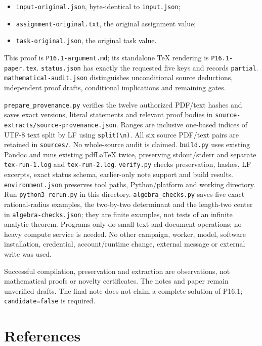 \documentclass[
  11pt,
]{article}
\providecommand{\tightlist}{%
  \setlength{\itemsep}{0pt}\setlength{\parskip}{0pt}}
\begin{document}
\begin{itemize}
\tightlist
\item
  \texttt{input-original.json}, byte-identical to \texttt{input.json};
\item
  \texttt{assignment-original.txt}, the original assignment value;
\item
  \texttt{task-original.json}, the original task value.
\end{itemize}

This proof is \texttt{P16.1-argument.md}; its standalone TeX rendering
is \texttt{P16.1-paper.tex}. \texttt{status.json} has exactly the
requested five keys and records \texttt{partial}.
\texttt{mathematical-audit.json} distinguishes unconditional source
deductions, independent proof drafts, conditional implications and
remaining gates.

\texttt{prepare\_provenance.py} verifies the twelve authorized PDF/text
hashes and saves exact versions, literal statements and relevant proof
bodies in \texttt{source-extracts/source-provenance.json}. Ranges are
inclusive one-based indices of UTF-8 text split by LF using
\texttt{split(\textquotesingle{}\textbackslash{}n\textquotesingle{})}.
All six source PDF/text pairs are retained in \texttt{sources/}. No
whole-source audit is claimed. \texttt{build.py} uses existing Pandoc
and runs existing pdfLaTeX twice, preserving stdout/stderr and separate
\texttt{tex-run-1.log} and \texttt{tex-run-2.log}. \texttt{verify.py}
checks preservation, hashes, LF excerpts, exact status schema,
earlier-only note support and build results. \texttt{environment.json}
preserves tool paths, Python/platform and working directory. Run
\texttt{python3\ rerun.py} in this directory.
\texttt{algebra\_checks.py} saves five exact rational-radius examples,
the two-by-two determinant and the length-two center in
\texttt{algebra-checks.json}; they are finite examples, not tests of an
infinite analytic theorem. Programs only do small text and document
operations; no heavy compute service is needed. No other campaign,
worker, model, software installation, credential, account/runtime
change, external message or external write was used.

Successful compilation, preservation and extraction are observations,
not mathematical proofs or novelty certificates. The notes and paper
remain unverified drafts. The final note does not claim a complete
solution of P16.1; \texttt{candidate=false} is required.

\section{References}\label{references}
\end{document}
